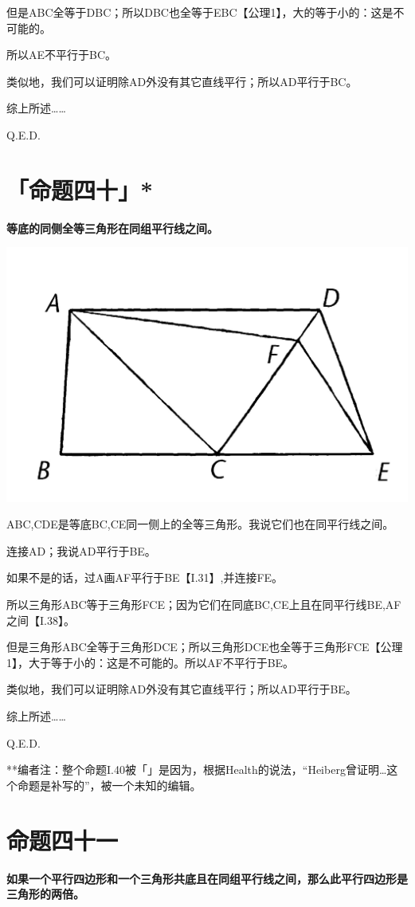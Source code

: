 \documentclass[
]{book}
\begin{document}
但是ABC全等于DBC；所以DBC也全等于EBC【公理1】，大的等于小的：这是不可能的。

所以AE不平行于BC。

类似地，我们可以证明除AD外没有其它直线平行；所以AD平行于BC。

综上所述\ldots\ldots{}

Q.E.D.

\hypertarget{ux547dux9898ux56dbux5341}{%
\section{「命题四十」*}\label{ux547dux9898ux56dbux5341}}

\textbf{等底的同侧全等三角形在同组平行线之间。}

\includegraphics[width=0.4\linewidth]{./image/img538}

ABC,CDE是等底BC,CE同一侧上的全等三角形。我说它们也在同平行线之间。

连接AD；我说AD平行于BE。

如果不是的话，过A画AF平行于BE【I.31】,并连接FE。

所以三角形ABC等于三角形FCE；因为它们在同底BC,CE上且在同平行线BE,AF之间【I.38】。

但是三角形ABC全等于三角形DCE；所以三角形DCE也全等于三角形FCE【公理1】，大于等于小的：这是不可能的。所以AF不平行于BE。

类似地，我们可以证明除AD外没有其它直线平行；所以AD平行于BE。

综上所述\ldots\ldots{}

Q.E.D.

**编者注：整个命题I.40被「」是因为，根据Health的说法，``Heiberg曾证明\ldots 这个命题是补写的''，被一个未知的编辑。

\hypertarget{ux547dux9898ux56dbux5341ux4e00}{%
\section{命题四十一}\label{ux547dux9898ux56dbux5341ux4e00}}

\textbf{如果一个平行四边形和一个三角形共底且在同组平行线之间，那么此平行四边形是三角形的两倍。}
\end{document}
